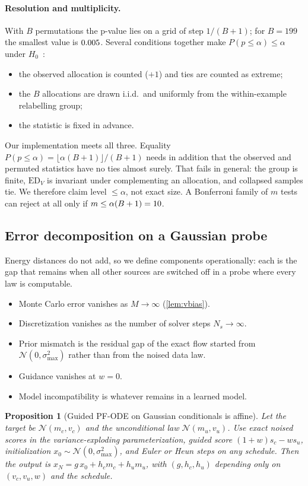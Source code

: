 \documentclass{article}
\theoremstyle{plain}
\newtheorem{proposition}[theorem]{Proposition}
\theoremstyle{definition}
\theoremstyle{remark}
\newcommand{\ED}{\mathrm{ED}}
\begin{document}
\paragraph{Resolution and multiplicity.}
With $B$ permutations the p-value lies on a grid of step $1/(B+1)$; for $B=199$ the smallest value is $0.005$.
Several conditions together make $P(p\le\alpha)\le\alpha$ under $H_0$~\citep{phipson2010permutation}:
\begin{itemize}
\item the observed allocation is counted ($+1$) and ties are counted as extreme;
\item the $B$ allocations are drawn i.i.d.\ and uniformly from the within-example relabelling group;
\item the statistic is fixed in advance.
\end{itemize}
Our implementation meets all three.
Equality $P(p\le\alpha)=\lfloor\alpha(B+1)\rfloor/(B+1)$ needs in addition that the observed and permuted statistics have no ties almost surely. That fails in general: the group is finite, $\ED_V$ is invariant under complementing an allocation, and collapsed samples tie. We therefore claim level $\le\alpha$, not exact size.
A Bonferroni family of $m$ tests can reject at all only if $m\le\alpha(B+1)=10$.

\subsection{Error decomposition on a Gaussian probe}
\label{sec:decomp}

Energy distances do not add, so we define components operationally: each is the gap that remains when all other sources are switched off in a probe where every law is computable.
\begin{itemize}
\item Monte Carlo error vanishes as $M\to\infty$ (\cref{lem:vbias}).
\item Discretization vanishes as the number of solver steps $N_s\to\infty$.
\item Prior mismatch is the residual gap of the exact flow started from $\mathcal N(0,\sigma_{\max}^2)$ rather than from the noised data law.
\item Guidance vanishes at $w=0$.
\item Model incompatibility is whatever remains in a learned model.
\end{itemize}

\begin{proposition}[Guided PF-ODE on Gaussian conditionals is affine]
\label{prop:affine}
Let the target be $\mathcal N(m_c,v_c)$ and the unconditional law $\mathcal N(m_u,v_u)$. Use exact noised scores in the variance-exploding parameterization, guided score $(1+w)s_c-ws_u$, initialization $x_0\sim\mathcal N(0,\sigma_{\max}^2)$, and Euler or Heun steps on any schedule.
Then the output is $x_N=g\,x_0+h_c m_c+h_u m_u$, with $(g,h_c,h_u)$ depending only on $(v_c,v_u,w)$ and the schedule.
\end{proposition}
\end{document}
